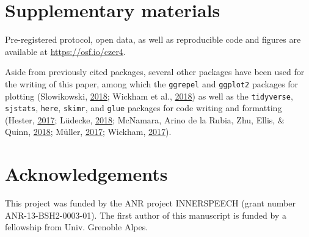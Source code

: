 \documentclass[a4paper,12pt,twoside,onecolumn,openright,final,oldfontcommands]{memoir}
\begin{document}
\hypertarget{suppCh5}{%
\section{Supplementary materials}\label{suppCh5}}

Pre-registered protocol, open data, as well as reproducible code and figures are available at \url{https://osf.io/czer4}.

Aside from previously cited packages, several other packages have been used for the writing of this paper, among which the \texttt{ggrepel} and \texttt{ggplot2} packages for plotting (Slowikowski, \protect\hyperlink{ref-R-ggrepel}{2018}; Wickham et al., \protect\hyperlink{ref-R-ggplot2}{2018}) as well as the \texttt{tidyverse}, \texttt{sjstats}, \texttt{here}, \texttt{skimr}, and \texttt{glue} packages for code writing and formatting (Hester, \protect\hyperlink{ref-R-glue}{2017}; Lüdecke, \protect\hyperlink{ref-R-sjstats}{2018}; McNamara, Arino de la Rubia, Zhu, Ellis, \& Quinn, \protect\hyperlink{ref-R-skimr}{2018}; Müller, \protect\hyperlink{ref-R-here}{2017}; Wickham, \protect\hyperlink{ref-R-tidyverse}{2017}).

\hypertarget{acknowledgements-2}{%
\section{Acknowledgements}\label{acknowledgements-2}}

This project was funded by the ANR project INNERSPEECH (grant number ANR-13-BSH2-0003-01). The first author of this manuscript is funded by a fellowship from Univ. Grenoble Alpes.

\newpage
\end{document}
